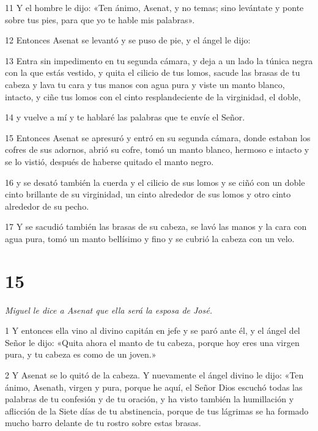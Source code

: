 \par 11 Y el hombre le dijo: «Ten ánimo, Asenat, y no temas; sino levántate y ponte sobre tus pies, para que yo te hable mis palabras».

\par 12 Entonces Asenat se levantó y se puso de pie, y el ángel le dijo:

\par 13 Entra sin impedimento en tu segunda cámara, y deja a un lado la túnica negra con la que estás vestido, y quita el cilicio de tus lomos, sacude las brasas de tu cabeza y lava tu cara y tus manos con agua pura y viste un manto blanco, intacto, y ciñe tus lomos con el cinto resplandeciente de la virginidad, el doble,

\par 14 y vuelve a mí y te hablaré las palabras que te envíe el Señor.

\par 15 Entonces Asenat se apresuró y entró en su segunda cámara, donde estaban los cofres de sus adornos, abrió su cofre, tomó un manto blanco, hermoso e intacto y se lo vistió, después de haberse quitado el manto negro.

\par 16 y se desató también la cuerda y el cilicio de sus lomos y se ciñó con un doble cinto brillante de su virginidad, un cinto alrededor de sus lomos y otro cinto alrededor de su pecho.

\par 17 Y se sacudió también las brasas de su cabeza, se lavó las manos y la cara con agua pura, tomó un manto bellísimo y fino y se cubrió la cabeza con un velo.

\chapter{15}

\par \textit{Miguel le dice a Asenat que ella será la esposa de José.}

\par 1 Y entonces ella vino al divino capitán en jefe y se paró ante él, y el ángel del Señor le dijo: «Quita ahora el manto de tu cabeza, porque hoy eres una virgen pura, y tu cabeza es como de un joven.»

\par 2 Y Asenat se lo quitó de la cabeza. Y nuevamente el ángel divino le dijo: «Ten ánimo, Asenath, virgen y pura, porque he aquí, el Señor Dios escuchó todas las palabras de tu confesión y de tu oración, y ha visto también la humillación y aflicción de la Siete días de tu abstinencia, porque de tus lágrimas se ha formado mucho barro delante de tu rostro sobre estas brasas.

